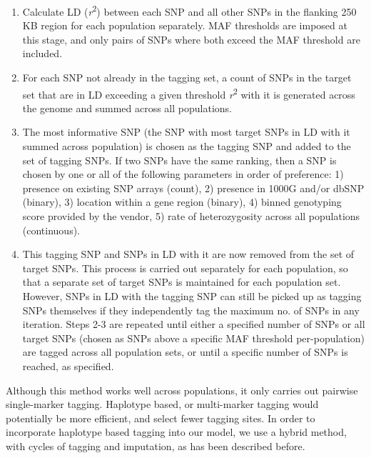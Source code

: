 {\begin{enumerate}
\item Calculate LD (\textit{r}\textsuperscript{2}) between each SNP and all other SNPs in the flanking 250 KB region for each population separately. MAF thresholds are imposed at this stage, and only pairs of SNPs where both exceed the MAF threshold are included.
\item For each SNP not already in the tagging set, a count of SNPs in the target set that are in LD exceeding a given threshold \textit{r}\textsuperscript{2} with it is generated across the genome and summed across all populations.
\item The most informative SNP (the SNP with most target SNPs in LD with it summed across population) is chosen as the tagging SNP and added to the set of tagging SNPs. If two SNPs have the same ranking, then a SNP is chosen by one or all of the following parameters in order of preference: 1) presence on existing SNP arrays (count), 2) presence in 1000G and/or dbSNP (binary), 3) location within a gene region (binary), 4) binned genotyping score provided by the vendor, 5) rate of heterozygosity across all populations (continuous).
\item This tagging SNP and SNPs in LD with it are now removed from the set of target SNPs. This process is carried out separately for each population, so that a separate set of target SNPs is maintained for each population set. However, SNPs in LD with the tagging SNP can still be picked up as tagging SNPs themselves if they independently tag the maximum no. of SNPs in any iteration.
Steps 2-3 are repeated until either a specified number of SNPs or all target SNPs (chosen as SNPs above a specific MAF threshold per-population) are tagged across all population sets, or until a specific number of SNPs is reached, as specified.
\end{enumerate}

Although this method works well across populations, it only carries out pairwise single-marker tagging. Haplotype based, or multi-marker tagging would potentially be more efficient, and select fewer tagging sites. In order to incorporate haplotype based tagging into our model, we use a hybrid method, with cycles of tagging and imputation, as has been described before.\cite{Hoffmann2011422}

}
